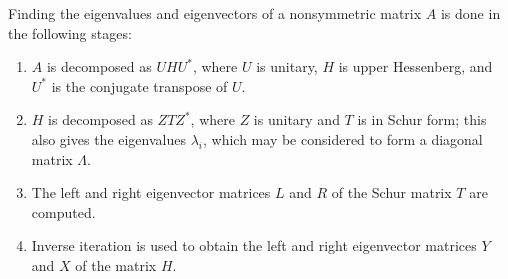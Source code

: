 \dent
Finding the eigenvalues and eigenvectors of a nonsymmetric
matrix $A$ is done in the following stages:
\begin{enumerate}

\item $A$ is decomposed as $U H U^*$, where $U$ is unitary,
$H$ is upper Hessenberg, and $U^*$ is the conjugate transpose of $U$.

\item $H$ is decomposed as $Z T Z^*$, where $Z$ is unitary
and $T$ is in Schur form; this also gives the eigenvalues
$\lambda_i$, which may be considered to form a diagonal
matrix $\Lambda$.

\item The left and right eigenvector matrices $L$ and $R$
of the Schur matrix $T$ are computed.

\item  Inverse iteration is used to obtain
the left and right eigenvector matrices $Y$ and $X$ of the matrix $H$.
\end{enumerate}

